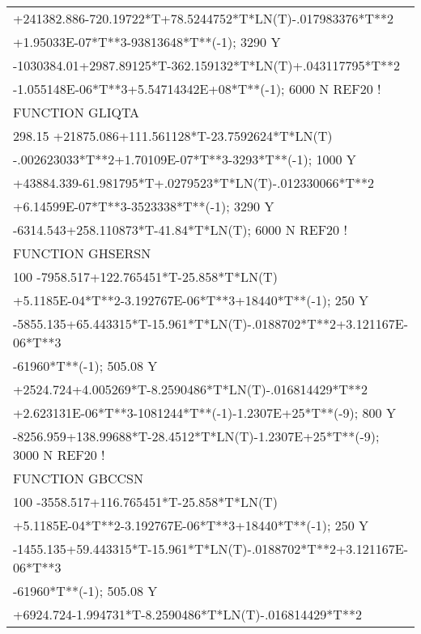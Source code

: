 \begin{longtable}[H]{ l l l }
	\multicolumn{3}{l}{+241382.886-720.19722*T+78.5244752*T*LN(T)-.017983376*T**2}\\
	\multicolumn{3}{l}{+1.95033E-07*T**3-93813648*T**(-1); 3290 Y}\\
	\multicolumn{3}{l}{-1030384.01+2987.89125*T-362.159132*T*LN(T)+.043117795*T**2}\\
	\multicolumn{3}{l}{-1.055148E-06*T**3+5.54714342E+08*T**(-1); 6000 N REF20 !}\\
	FUNCTION GLIQTA & & \\
	\multicolumn{3}{l}{298.15 +21875.086+111.561128*T-23.7592624*T*LN(T)}\\
	\multicolumn{3}{l}{-.002623033*T**2+1.70109E-07*T**3-3293*T**(-1); 1000 Y}\\
	\multicolumn{3}{l}{+43884.339-61.981795*T+.0279523*T*LN(T)-.012330066*T**2}\\
	\multicolumn{3}{l}{+6.14599E-07*T**3-3523338*T**(-1); 3290 Y}\\
	\multicolumn{3}{l}{-6314.543+258.110873*T-41.84*T*LN(T); 6000 N REF20 !}\\
	FUNCTION GHSERSN & & \\
	\multicolumn{3}{l}{100 -7958.517+122.765451*T-25.858*T*LN(T)}\\
	\multicolumn{3}{l}{+5.1185E-04*T**2-3.192767E-06*T**3+18440*T**(-1); 250 Y}\\
	\multicolumn{3}{l}{-5855.135+65.443315*T-15.961*T*LN(T)-.0188702*T**2+3.121167E-06*T**3}\\
	\multicolumn{3}{l}{-61960*T**(-1); 505.08 Y}\\
	\multicolumn{3}{l}{+2524.724+4.005269*T-8.2590486*T*LN(T)-.016814429*T**2}\\
	\multicolumn{3}{l}{+2.623131E-06*T**3-1081244*T**(-1)-1.2307E+25*T**(-9); 800 Y}\\
	\multicolumn{3}{l}{-8256.959+138.99688*T-28.4512*T*LN(T)-1.2307E+25*T**(-9); 3000 N REF20 !}\\
	FUNCTION GBCCSN & & \\
	\multicolumn{3}{l}{100 -3558.517+116.765451*T-25.858*T*LN(T)}\\
	\multicolumn{3}{l}{+5.1185E-04*T**2-3.192767E-06*T**3+18440*T**(-1); 250 Y}\\
	\multicolumn{3}{l}{-1455.135+59.443315*T-15.961*T*LN(T)-.0188702*T**2+3.121167E-06*T**3}\\
	\multicolumn{3}{l}{-61960*T**(-1); 505.08 Y}\\
	\multicolumn{3}{l}{+6924.724-1.994731*T-8.2590486*T*LN(T)-.016814429*T**2}\\

\end{longtable}
